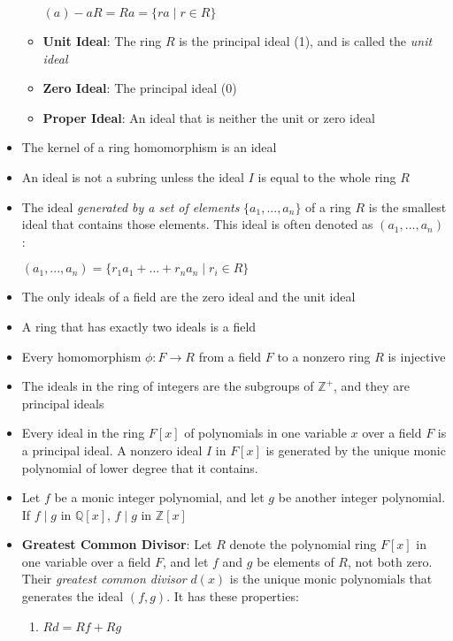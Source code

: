 \documentclass[12pt]{article}
\begin{document}
\begin{itemize}
\begin{itemize}
\begin{center}
      $(a) - aR = Ra = \{ra \mid r \in R\}$
    \end{center}
    \item \textbf{Unit Ideal}: The ring $R$ is the principal ideal (1), and is  called the \textit{unit ideal}
    \item \textbf{Zero Ideal}: The principal ideal (0)
    \item \textbf{Proper Ideal}: An ideal that is neither the unit or zero ideal
  \end{itemize}
  \item The kernel of a ring homomorphism is an ideal
  \item An ideal is not a subring unless the ideal $I$ is equal to the whole ring $R$
  \item The ideal \textit{generated by a set of elements} $\{a_1, ..., a_n\}$ of a ring $R$ is the smallest ideal that contains those elements. This ideal is often denoted as $(a_1, ..., a_n)$:
  \begin{center}
    $(a_1, ..., a_n) = \{r_1a_1 + ... + r_na_n \mid r_i \in R\}$
  \end{center}
  \item The only ideals of a field are the zero ideal and the unit ideal
  \item A ring that has exactly two ideals is a field
  \item Every homomorphism $\phi: F \to R$ from a field $F$ to a nonzero ring $R$ is injective
  \item The ideals in the ring of integers are the subgroups of $\mathbb{Z}^+$, and they are principal ideals
  \item Every ideal in the ring $F[x]$ of polynomials in one variable $x$ over a field $F$ is a principal ideal. A nonzero ideal $I$ in $F[x]$ is generated by the unique monic polynomial of lower degree that it contains.
  \item Let $f$ be a monic integer polynomial, and let $g$ be another integer polynomial. If $f\mid g$ in $\mathbb{Q}[x]$, $f\mid g$ in $\mathbb{Z}[x]$
  \item \textbf{Greatest Common Divisor}: Let $R$ denote the polynomial ring $F[x]$ in one variable over a field $F$, and let $f$ and $g$ be elements of $R$, not both zero. Their \textit{greatest common divisor} $d(x)$ is the unique monic polynomials that generates the ideal $(f,g)$. It has these properties:
  \begin{enumerate}
    \begin{enumerate}
      \item $Rd = Rf + Rg$

\end{enumerate}
\end{enumerate}
\end{itemize}
\end{document}
